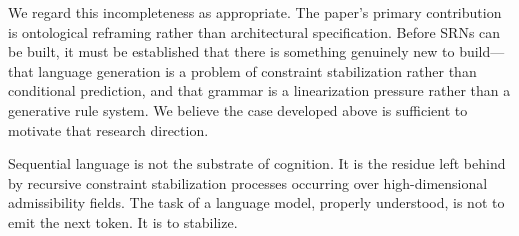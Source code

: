 \documentclass[11pt, a4paper]{article}
\theoremstyle{srn}
\theoremstyle{srnremark}
\begin{document}
We regard this incompleteness as appropriate.
The paper's primary contribution is ontological reframing rather than
architectural specification.
Before SRNs can be built, it must be established that there is
something genuinely new to build---that language generation is a
problem of constraint stabilization rather than conditional prediction,
and that grammar is a linearization pressure rather than a
generative rule system.
We believe the case developed above is sufficient to motivate that
research direction.

Sequential language is not the substrate of cognition.
It is the residue left behind by recursive constraint stabilization
processes occurring over high-dimensional admissibility fields.
The task of a language model, properly understood, is not to emit the
next token.
It is to stabilize.
\end{document}
